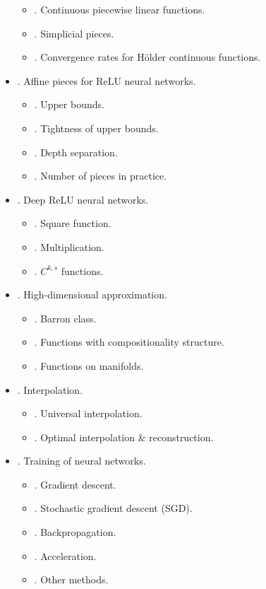 \documentclass{article}
\begin{document}
\begin{itemize}
\begin{itemize}
		\item {. Continuous piecewise linear functions.}
		\item {. Simplicial pieces.}
		\item {. Convergence rates for H\"older continuous functions.}
	\end{itemize}
	\item {. Affine pieces for ReLU neural networks.}
	\begin{itemize}
		\item {. Upper bounds.}
		\item {. Tightness of upper bounds.}
		\item {. Depth separation.}
		\item {. Number of pieces in practice.}
	\end{itemize}
	\item {. Deep ReLU neural networks.}
	\begin{itemize}
		\item {. Square function.}
		\item {. Multiplication.}
		\item {. $C^{k,s}$ functions.}
	\end{itemize}
	\item {. High-dimensional approximation.}
	\begin{itemize}
		\item {. Barron class.}
		\item {. Functions with compositionality structure.}
		\item {. Functions on manifolds.}
	\end{itemize}
	\item {. Interpolation.}
	\begin{itemize}
		\item {. Universal interpolation.}
		\item {. Optimal interpolation \& reconstruction.}
	\end{itemize}
	\item {. Training of neural networks.}
	\begin{itemize}
		\item {. Gradient descent.}
		\item {. Stochastic gradient descent (SGD).}
		\item {. Backpropagation.}
		\item {. Acceleration.}
		\item {. Other methods.}

\end{itemize}
\end{itemize}
\end{document}
